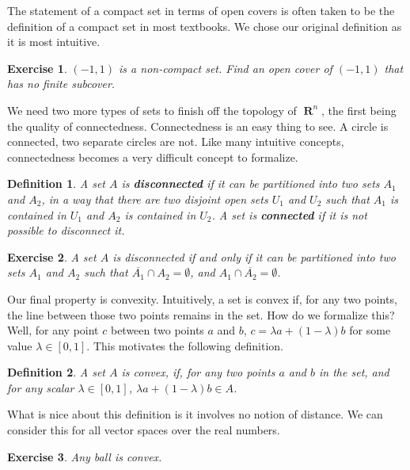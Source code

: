 \documentclass{report}
\newtheorem{definition}{Definition}
\newtheorem{exercise}{Exercise}
\DeclareMathOperator{\real}{\mathbf{R}}
\begin{document}
The statement of a compact set in terms of open covers is often taken to be the definition of a compact set in most textbooks. We chose our original definition as it is most intuitive.

\begin{exercise}
  $(-1,1)$ is a non-compact set. Find an open cover of $(-1,1)$ that has no finite subcover.
\end{exercise}

We need two more types of sets to finish off the topology of $\real^n$, the first being the quality of connectedness. Connectedness is an easy thing to see. A circle is connected, two separate circles are not. Like many intuitive concepts, connectedness becomes a very difficult concept to formalize.

\begin{definition}
  A set $A$ is {\bf disconnected} if it can be partitioned into two sets $A_1$ and $A_2$, in a way that there are two disjoint open sets $U_1$ and $U_2$ such that $A_1$ is contained in $U_1$ and $A_2$ is contained in $U_2$. A set is {\bf connected} if it is not possible to disconnect it.
\end{definition}

\begin{exercise}
  A set $A$ is disconnected if and only if it can be partitioned into two sets $A_1$ and $A_2$ such that $\overline{A_1} \cap A_2 = \emptyset$, and $A_1 \cap \overline{A_2} = \emptyset$.
\end{exercise}

Our final property is convexity. Intuitively, a set is convex if, for any two points, the line between those two points remains in the set. How do we formalize this? Well, for any point $c$ between two points $a$ and $b$, $c = \lambda a + (1 - \lambda)b$ for some value $\lambda \in [0,1]$. This motivates the following definition.

\begin{definition}
  A set $A$ is convex, if, for any two points $a$ and $b$ in the set, and for any scalar $\lambda \in [0,1]$, $\lambda a + (1 - \lambda) b \in A$.
\end{definition}

What is nice about this definition is it involves no notion of distance. We can consider this for all vector spaces over the real numbers.

\begin{exercise}
  Any ball is convex.
\end{exercise}
\end{document}
